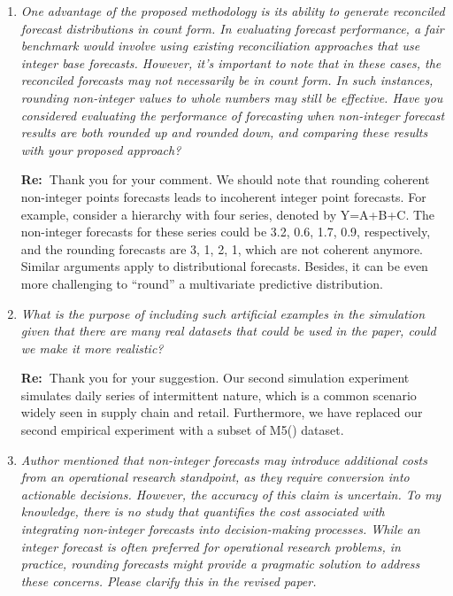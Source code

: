 \documentclass[11pt,a4paper]{article}
\newcommand{\RE}[2][Re:~]{{\color{blue}\textbf{#1}#2}}
\begin{document}
\begin{enumerate}
  \item \textit{One advantage of the proposed methodology is its ability to generate reconciled forecast distributions in count form. In evaluating forecast performance, a fair benchmark would involve using existing reconciliation approaches that use integer base forecasts. However, it's important to note that in these cases, the reconciled forecasts may not necessarily be in count form. In such instances, rounding non-integer values to whole numbers may still be effective. Have you considered evaluating the performance of forecasting when non-integer forecast results are both rounded up and rounded down, and comparing these results with your proposed approach?}

  \RE{Thank you for your comment. We should note that rounding coherent non-integer points forecasts leads to incoherent integer point forecasts. For example, consider a hierarchy with four series, denoted by Y=A+B+C. The non-integer forecasts for these series could be 3.2, 0.6, 1.7, 0.9, respectively, and the rounding forecasts are 3, 1, 2, 1, which are not coherent anymore. Similar arguments apply to distributional forecasts. Besides, it can be even more challenging to ``round'' a multivariate predictive distribution.}


  \item \textit{What is the purpose of including such artificial examples in the simulation given that there are many real datasets that could be used in the paper, could we make it more realistic?}

  \RE{Thank you for your suggestion. Our second simulation experiment simulates daily series of intermittent nature, which is a common scenario widely seen in supply chain and retail. Furthermore, we have replaced our second empirical experiment with a subset of M5(\citealp{makridakisM5AccuracyCompetition2022}) dataset.}

  \item \textit{Author mentioned that non-integer forecasts may introduce additional costs from an operational research standpoint, as they require conversion into actionable decisions. However, the accuracy of this claim is uncertain. To my knowledge, there is no study that quantifies the cost associated with integrating non-integer forecasts into decision-making processes. While an integer forecast is often preferred for operational research problems, in practice, rounding forecasts might provide a pragmatic solution to address these concerns. Please clarify this in the revised paper.}
  

\end{enumerate}
\end{document}
